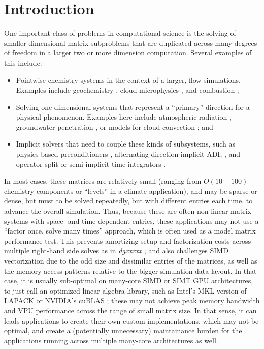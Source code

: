 \documentclass[conference]{IEEEtran}
\begin{document}
\section{Introduction}
% 
One important class of problems in computational science is the solving
  of smaller-dimensional matrix subproblems that are duplicated across
  many degrees of freedom in a larger two or more dimension computation.
Several examples of this include: 
\begin{itemize}
\item Pointwise chemistry systems in the context of a larger, 
  flow simulations. 
Examples include geochemistry \cite{??}, cloud microphysics \cite{??},
  and combustion \cite{??};
\item Solving one-dimensional systems that represent a ``primary''
  direction for a physical phenomenon.
Examples here include atmospheric radiation \cite{??}, groundwater
  penetration \cite{??}, or models for cloud convection \cite{??}; and
\item Implicit solvers that need to couple these kinds of subsystems, 
  such as physics-based preconditioners \cite{??}, alternating 
  direction implicit ADI, \cite{??}, and operator-split or
  semi-implicit time integrators \cite{??}.
\end{itemize}
In most cases, these matrices are relatively small 
  (ranging from $O(10-100)$ chemistry components or ``levels'' 
  in a climate application), and may be sparse or dense, but must 
  to be solved repeatedly, but with different entries each time, 
  to advance the overall simulation.
Thus, because these are often non-linear matrix systems with space- and 
  time-dependent entries, these applications may not use a 
  ``factor once, solve many times'' approach, which is often used 
  as a model matrix performance test.
This prevents amortizing setup and factorization costs
  across multiple right-hand side solves as in \emph{dgxxxxx} \cite{??},
  and also challenges SIMD vectorization due to the odd size and
  dissimilar entries of the matrices, as well as the 
  memory access patterns relative to the bigger simulation data layout.
In that case, it is usually sub-optimal on many-core SIMD 
  or SIMT GPU architectures,
  to just call an optimized linear algebra library, 
  such as Intel's MKL version of LAPACK \cite{??} or NVIDIA's
  cuBLAS \cite{??}; these may not achieve peak memory bandwidth 
  and VPU performance across the range of small matrix size. 
In that sense, it can leads applications to create their own 
  custom implementations, which may not be optimal, and create a 
  (potentially unnecessary) maintainance burden for the applications 
  running across multiple many-core architectures as well. 
  
\end{document}
